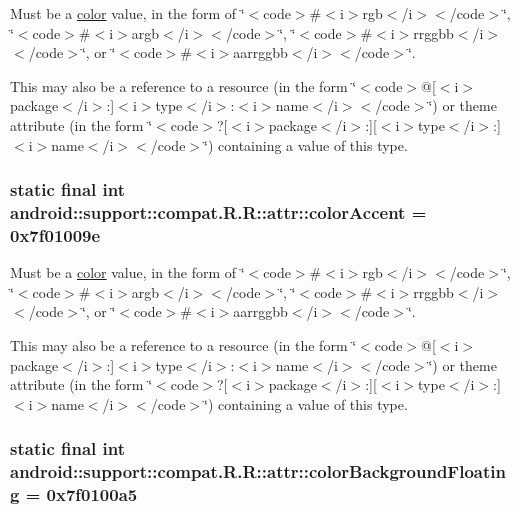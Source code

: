 Must be a \hyperlink{classandroid_1_1support_1_1compat_1_1_r_1_1color}{color} value, in the form of \char`\"{}$<$code$>$\#$<$i$>$rgb$<$/i$>$$<$/code$>$\char`\"{}, \char`\"{}$<$code$>$\#$<$i$>$argb$<$/i$>$$<$/code$>$\char`\"{}, \char`\"{}$<$code$>$\#$<$i$>$rrggbb$<$/i$>$$<$/code$>$\char`\"{}, or \char`\"{}$<$code$>$\#$<$i$>$aarrggbb$<$/i$>$$<$/code$>$\char`\"{}. 

This may also be a reference to a resource (in the form \char`\"{}$<$code$>$@\mbox{[}$<$i$>$package$<$/i$>$:\mbox{]}$<$i$>$type$<$/i$>$:$<$i$>$name$<$/i$>$$<$/code$>$\char`\"{}) or theme attribute (in the form \char`\"{}$<$code$>$?\mbox{[}$<$i$>$package$<$/i$>$:\mbox{]}\mbox{[}$<$i$>$type$<$/i$>$:\mbox{]}$<$i$>$name$<$/i$>$$<$/code$>$\char`\"{}) containing a value of this type. \hypertarget{classandroid_1_1support_1_1compat_1_1_r_1_1attr_7eef78935685929fef5c3bc43e933fe0}{
\subsubsection[{colorAccent}]{\setlength{\rightskip}{0pt plus 5cm}static final int android::support::compat.R.R::attr::colorAccent = 0x7f01009e}}
\label{classandroid_1_1support_1_1compat_1_1_r_1_1attr_7eef78935685929fef5c3bc43e933fe0}


Must be a \hyperlink{classandroid_1_1support_1_1compat_1_1_r_1_1color}{color} value, in the form of \char`\"{}$<$code$>$\#$<$i$>$rgb$<$/i$>$$<$/code$>$\char`\"{}, \char`\"{}$<$code$>$\#$<$i$>$argb$<$/i$>$$<$/code$>$\char`\"{}, \char`\"{}$<$code$>$\#$<$i$>$rrggbb$<$/i$>$$<$/code$>$\char`\"{}, or \char`\"{}$<$code$>$\#$<$i$>$aarrggbb$<$/i$>$$<$/code$>$\char`\"{}. 

This may also be a reference to a resource (in the form \char`\"{}$<$code$>$@\mbox{[}$<$i$>$package$<$/i$>$:\mbox{]}$<$i$>$type$<$/i$>$:$<$i$>$name$<$/i$>$$<$/code$>$\char`\"{}) or theme attribute (in the form \char`\"{}$<$code$>$?\mbox{[}$<$i$>$package$<$/i$>$:\mbox{]}\mbox{[}$<$i$>$type$<$/i$>$:\mbox{]}$<$i$>$name$<$/i$>$$<$/code$>$\char`\"{}) containing a value of this type. \hypertarget{classandroid_1_1support_1_1compat_1_1_r_1_1attr_3cd032ec87a13a0db90b0364f14d0c29}{
\subsubsection[{colorBackgroundFloating}]{\setlength{\rightskip}{0pt plus 5cm}static final int android::support::compat.R.R::attr::colorBackgroundFloating = 0x7f0100a5}}
\label{classandroid_1_1support_1_1compat_1_1_r_1_1attr_3cd032ec87a13a0db90b0364f14d0c29}


